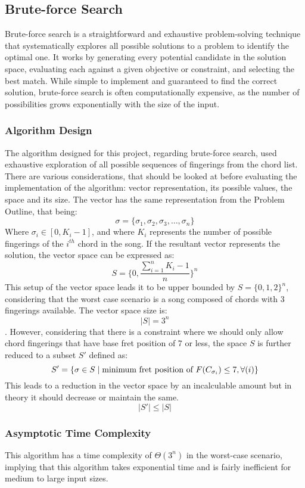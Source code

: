 \documentclass[conference]{IEEEtran}
\begin{document}
\subsection{Brute-force Search}
Brute-force search is a straightforward and exhaustive problem-solving technique that systematically explores all possible solutions to a problem to identify the optimal one. It works by generating every potential candidate in the solution space, evaluating each against a given objective or constraint, and selecting the best match. While simple to implement and guaranteed to find the correct solution, brute-force search is often computationally expensive, as the number of possibilities grows exponentially with the size of the input. 
\subsubsection{Algorithm Design}
The algorithm designed for this project, regarding brute-force search, used exhaustive exploration of all possible sequences of fingerings from the chord list. 
There are various considerations, that should be looked at before evaluating the implementation of the algorithm: vector representation, its possible values, the space and its size.
\newline 
\noindent The vector has the same representation from the Problem Outline, that being: \[ \sigma = \{\sigma_1, \sigma_2, \sigma_3, \ldots, \sigma_n\} \] 
\indent Where \(\sigma_i \in [0, K_i - 1]\), and where \( K_i \) represents the number of possible fingerings of the $i^{th}$ chord in the song. If the resultant vector represents the solution, the vector space can be expressed as:
\[ S = \{0, \frac{\sum_{i=1}^{n}K_i - 1}{n} \}^{n} \]
\indent This setup of the vector space leads it to be upper bounded by \( S = \{0,1,2\}^{n} \), considering that the worst case scenario is a song composed of chords with $3$ fingerings available. The vector space size is:
\[ |S| = 3^{n} \].
\indent However, considering that there is a constraint where we should only allow chord fingerings that have base fret position of 7 or less, the space $S$ is further reduced to a subset $S'$ defined as:
\[ S' = \{\sigma \in S \mid \text{minimum fret position of \( F(C_{\sigma_i}) \)} \leq 7, \forall(i)\} \]
\indent This leads to a reduction in the vector space by an incalculable amount but in theory it should decrease or maintain the same.
\[ |S'| \leq |S| \]

\subsubsection{Asymptotic Time Complexity}
This algorithm has a time complexity of \(\Theta(3^{n})\) in the worst-case scenario, implying that this algorithm takes exponential time and is fairly inefficient for medium to large input sizes.  
\end{document}
